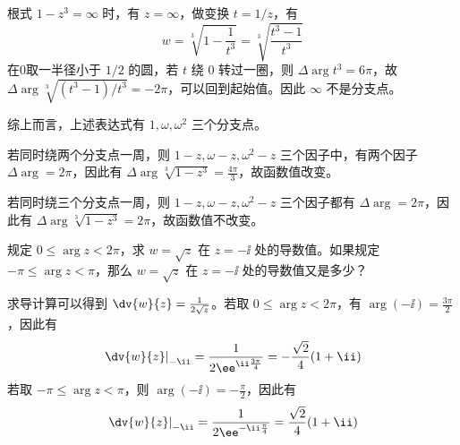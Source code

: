 \begin{question}
\begin{solution}
\begin{enumerate}
根式 \(1-z^3=\infty\) 时，有 \(z=\infty\)，做变换 \(t=1/z\)，有 \[
w =\sqrt[3]{1-\frac1{t^3}}=\sqrt[3]{\frac{t^3-1}{t^3}}
\] 在0取一半径小于 \(1/2\) 的圆，若 \(t\) 绕 \(0\) 转过一圈，则 \(\Delta \arg t^3=6\pi\)，故 \(\Delta \arg \sqrt[3]{(t^3-1)/t^3}=-2\pi\)，可以回到起始值。因此 \(\infty\) 不是分支点。

综上而言，上述表达式有 \(1,\omega,\omega^2\) 三个分支点。

\medskip

若同时绕两个分支点一周，则 \(1-z,\omega-z,\omega^2-z\) 三个因子中，有两个因子 \(\Delta \arg = 2\pi\)，因此有 \(\Delta \arg \sqrt[3]{1-z^3} = \frac{4\pi}{3}\)，故函数值改变。

若同时绕三个分支点一周，则 \(1-z,\omega-z,\omega^2-z\) 三个因子都有 \(\Delta \arg = 2\pi\)，因此有 \(\Delta \arg \sqrt[3]{1-z^3} = 2\pi\)，故函数值不改变。
\end{enumerate}
\end{solution}
\end{question}

\begin{question}
规定 \(0 \le \arg z < 2 \pi\)，求 \(w = \sqrt{z}\) 在 \(z = -\ii\) 处的导数值。如果规定 \(-\pi \le \arg z < \pi\)，那么 \(w = \sqrt{z}\) 在 \(z = -\ii\) 处的导数值又是多少？
\begin{solution}
求导计算可以得到 \(\dv{w}{z}= \frac{1}{2\sqrt{z}}\)。若取 \(0\le \arg z < 2\pi\)，有 \(\arg (-\ii)=\frac{3\pi}{2}\)，因此有 \[
\left. \dv{w}{z} \right|_{-\ii}= \frac{1}{2 \ee^{\ii \frac{3\pi}{4}}} =-\frac{\sqrt{2}}{4} (1+\ii)
\] 若取 \(-\pi \le \arg z < \pi\)，则 \(\arg (-\ii)=-\frac{\pi}{2}\)，因此有 \[
\left. \dv{w}{z} \right|_{-\ii} =\frac{1}{2 \ee^{-\ii \frac{\pi}{4}}} = \frac{\sqrt{2}}{4}(1+\ii)
\]
\end{solution}
\end{question}

